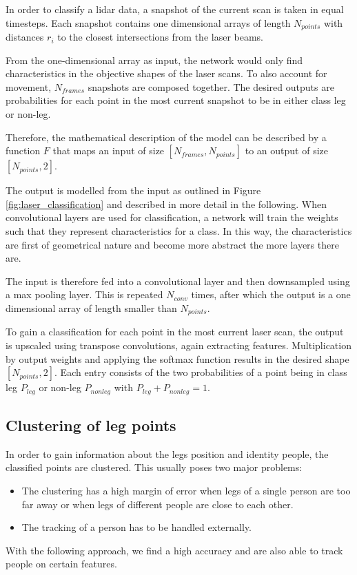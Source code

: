 In order to classify a lidar data, a snapshot of the current scan is taken in equal timesteps. Each snapshot contains one dimensional arrays of length $N_{points}$ with distances $r_i$ to the closest intersections from the laser beams.

From the one-dimensional array as input, the network would only find characteristics in the objective shapes of the laser scans. To also account for movement, $N_{frames}$ snapshots are composed together.
The desired outputs are probabilities for each point in the most current snapshot to be in either class leg or non-leg.

Therefore, the mathematical description of the model can be described by a function $F$ that maps an input of size $[N_{frames}, N_{points}]$ to an output of size $[N_{points}, 2]$.

The output is modelled from the input as outlined in Figure \ref{fig:laser_classification} and described in more detail in the following.
When convolutional layers are used for classification, a network will train the weights such that they represent characteristics for a class. In this way, the characteristics are first of geometrical nature and become more abstract the more layers there are.

The input is therefore fed into a convolutional layer and then downsampled using a max pooling layer. This is repeated $N_{conv}$ times, after which the output is a one dimensional array of length smaller than $N_{points}$.

To gain a classification for each point in the most current laser scan, the output is upscaled using transpose convolutions, again extracting features. Multiplication by output weights and applying the softmax function results in the desired shape $[N_{points}, 2]$. Each entry consists of the two probabilities of a point being in class leg $P_{leg}$ or non-leg $P_{nonleg}$ with $P_{leg} + P_{nonleg} = 1$.



\subsection{Clustering of leg points}
\label{subs:clustering}

In order to gain information about the legs position and identity people, the classified points are clustered. This usually poses two major problems:
\begin{itemize}
\item The clustering has a high margin of error when legs of a single person are too far away or when legs of different people are close to each other.
\item The tracking of a person has to be handled externally.
\end{itemize} 
With the following approach, we find a high accuracy and are also able to track people on certain features.

